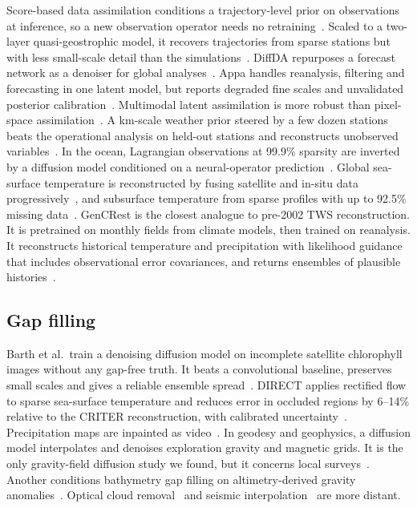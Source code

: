 Score-based data assimilation conditions a trajectory-level prior on observations at inference, so a new observation operator needs no retraining~\cite{rozet2023sda}. Scaled to a two-layer quasi-geostrophic model, it recovers trajectories from sparse stations but with less small-scale detail than the simulations~\cite{rozet2023sdaqg}. DiffDA repurposes a forecast network as a denoiser for global analyses~\cite{huang2024diffda}. Appa handles reanalysis, filtering and forecasting in one latent model, but reports degraded fine scales and unvalidated posterior calibration~\cite{andry2025appa}. Multimodal latent assimilation is more robust than pixel-space assimilation~\cite{qu2024deepgenda}. A km-scale weather prior steered by a few dozen stations beats the operational analysis on held-out stations and reconstructs unobserved variables~\cite{manshausen2025genda}. In the ocean, Lagrangian observations at 99.9\% sparsity are inverted by a diffusion model conditioned on a neural-operator prediction~\cite{asefi2025lagrangian}. Global sea-surface temperature is reconstructed by fusing satellite and in-situ data progressively~\cite{li2026sage}, and subsurface temperature from sparse profiles with up to 92.5\% missing data~\cite{song2025reconmost}. GenCRest is the closest analogue to pre-2002 TWS reconstruction. It is pretrained on monthly fields from climate models, then trained on reanalysis. It reconstructs historical temperature and precipitation with likelihood guidance that includes observational error covariances, and returns ensembles of plausible histories~\cite{qian2026gencrest}.

\subsection{Gap filling}

Barth et al.\ train a denoising diffusion model on incomplete satellite chlorophyll images without any gap-free truth. It beats a convolutional baseline, preserves small scales and gives a reliable ensemble spread~\cite{barth2024dindiff}. DIRECT applies rectified flow to sparse sea-surface temperature and reduces error in occluded regions by 6--14\% relative to the CRITER reconstruction, with calibrated uncertainty~\cite{rovscek2026direct}. Precipitation maps are inpainted as video~\cite{kishikawa2025precipinpaint}. In geodesy and geophysics, a diffusion model interpolates and denoises exploration gravity and magnetic grids. It is the only gravity-field diffusion study we found, but it concerns local surveys~\cite{hou2025gravmag}. Another conditions bathymetry gap filling on altimetry-derived gravity anomalies~\cite{chen2026mbesddpm}. Optical cloud removal~\cite{zou2023diffcr} and seismic interpolation~\cite{durall2023seismic,wei2023seismicddim} are more distant.

